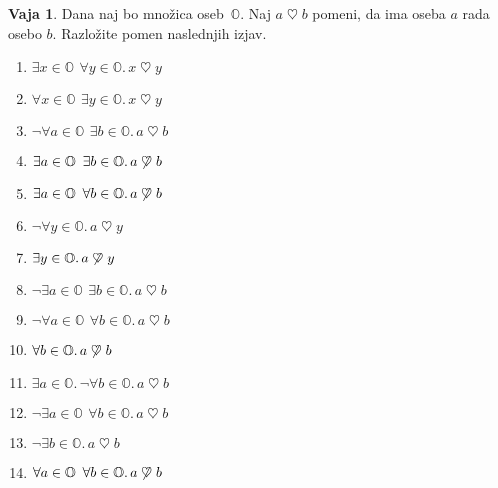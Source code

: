 \documentclass{article}
\theoremstyle{definition}
\newtheorem{vaja}{Vaja}
\begin{document}
\newcommand{\rad}{\mathrel{\heartsuit}}
\begin{vaja}
Dana naj bo množica oseb~$\mathbb{O}$. Naj $a \rad b$ pomeni, da ima oseba $a$ rada osebo $b$.
Razložite pomen naslednjih izjav.
\begin{enumerate}
\item $\exists x \in \mathbb{O}\,\ \forall y \in \mathbb{O}. \, x \rad y$
\item $\forall x \in \mathbb{O}\,\ \exists y \in \mathbb{O}. \, x \rad y$
\item $\lnot \forall a \in \mathbb{O}\,\ \exists b \in \mathbb{O}.  \, a \rad b$
\item $\exists a \in \mathbb{O}\,\ \exists b \in \mathbb{O}. \, a \not\rad b$
\item $\exists a \in \mathbb{O}\,\ \forall b \in \mathbb{O}. \, a \not\rad b$
\item $\lnot \forall y \in \mathbb{O}. \, a \rad y$
\item $\exists y \in \mathbb{O}. \, a \not\rad y$
\item $\lnot \exists a \in \mathbb{O}\,\ \exists b \in \mathbb{O}. \, a \rad b$
\item $\lnot \forall a \in \mathbb{O}\,\ \forall b \in \mathbb{O}. \, a \rad b$
\item $\forall b \in \mathbb{O}. \, a \not\rad b$
\item $\exists a \in \mathbb{O}. \, \lnot \forall b \in \mathbb{O}. \,  a \rad b$
\item $\lnot \exists a \in \mathbb{O}\,\ \forall b \in \mathbb{O}. \, a \rad b$
\item $\lnot \exists b \in \mathbb{O}. \, a \rad b$
\item $\forall a \in \mathbb{O}\,\ \forall b \in \mathbb{O}. \,  a \not\rad b$
\end{enumerate}
\end{vaja}
\end{document}
